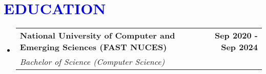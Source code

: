 \documentclass[letterpaper,11pt]{article}
\makeatletter
\newcommand{\resumeSubheading}[4]{
	\vspace{-2pt}\item
	\begin{tabular*}{1.0\textwidth}[t]{l@{\extracolsep{\fill}}r}
		\textbf{\large#1} & \textbf{\small #2} \\
		\textit{\large#3} & \textit{\small #4} \\
		
	\end{tabular*}\vspace{-7pt}
}
\newcommand{\resumeSubHeadingListStart}{\begin{itemize}[leftmargin=0.0in, label={}]}
\newcommand{\resumeSubHeadingListEnd}{\end{itemize}}
\makeatother
\begin{document}
	


\vspace{-5pt}  %

	\section{\textcolor{blue}{EDUCATION}}
	\resumeSubHeadingListStart
	\resumeSubheading
	{National University of Computer and Emerging Sciences (FAST NUCES)}{Sep 2020 - Sep 2024}
	{Bachelor of Science (Computer Science)  \textbf{}  \textbf{}}{}
	\resumeSubHeadingListEnd
	\vspace{-15pt}
	
	
\end{document}
